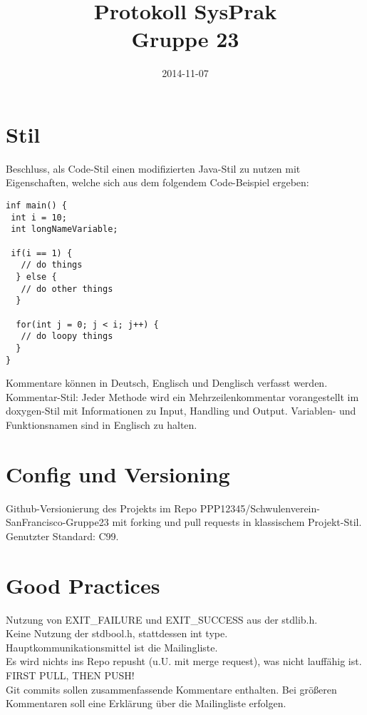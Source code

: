 \documentclass[11pt]{article}
\title{\textbf{Protokoll SysPrak\\Gruppe 23}}
\author{}
\date{2014-11-07}
\begin{document}
\maketitle

\section*{Stil}
Beschluss, als Code-Stil einen modifizierten Java-Stil zu nutzen mit Eigenschaften, welche sich aus dem folgendem Code-Beispiel ergeben:
\begin{verbatim}
inf main() {
 int i = 10;
 int longNameVariable;
 
 if(i == 1) {
   // do things
  } else {
   // do other things
  }
  
  for(int j = 0; j < i; j++) {
   // do loopy things
  }
}
\end{verbatim}
Kommentare können in Deutsch, Englisch und Denglisch verfasst werden.\\
Kommentar-Stil: Jeder Methode wird ein Mehrzeilenkommentar vorangestellt im doxygen-Stil mit Informationen zu Input, Handling und Output.
Variablen- und Funktionsnamen sind in Englisch zu halten.\\
\section*{Config und Versioning}
Github-Versionierung des Projekts im Repo PPP12345/Schwulenverein-SanFrancisco-Gruppe23 mit forking und pull requests in klassischem Projekt-Stil.\\
Genutzter Standard: C99.\\
\section*{Good Practices}
Nutzung von EXIT\_FAILURE und EXIT\_SUCCESS aus der stdlib.h.\\
Keine Nutzung der stdbool.h, stattdessen int type.\\
Hauptkommunikationsmittel ist die Mailingliste.\\
Es wird nichts ins Repo repusht (u.U. mit merge request), was nicht lauffähig ist.\\
FIRST PULL, THEN PUSH!\\
Git commits sollen zusammenfassende Kommentare enthalten. Bei größeren Kommentaren soll eine Erklärung über die Mailingliste erfolgen.
\end{document}
